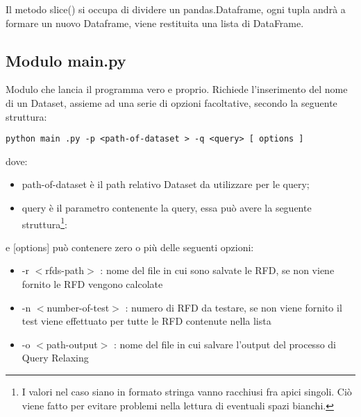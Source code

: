 Il metodo slice() si occupa di dividere un pandas.Dataframe, ogni tupla andrà a formare un nuovo Dataframe, viene restituita una lista di DataFrame.

\subsection{Modulo main.py}
Modulo che lancia il programma vero e proprio. Richiede
l'inserimento del nome di un Dataset, assieme ad una serie di opzioni
facoltative, secondo la seguente struttura:
\begin{listing}[H]
\begin{verbatim}
python main .py -p <path-of-dataset > -q <query> [ options ]
\end{verbatim}
\end{listing}

dove:
\begin{itemize}
\item path-of-dataset è il path relativo Dataset da utilizzare per le query;
\item query è il parametro contenente la query, essa può avere la seguente struttura\footnote{I valori nel caso siano in formato stringa vanno racchiusi fra apici singoli. Ciò viene fatto per evitare problemi nella lettura di eventuali spazi bianchi.}:
\end{itemize}
e [options] può contenere zero o più delle seguenti opzioni:

\begin{itemize}
\item -r $<$rfds-path$>$ : nome del file in cui sono salvate le RFD, se non viene fornito le RFD vengono calcolate
\item -n $<$number-of-test$>$ : numero di RFD da testare, se non viene fornito il test viene effettuato per tutte le RFD contenute nella lista
\item -o $<$path-output$>$ : nome del file in cui salvare l'output del processo di Query Relaxing
\end{itemize}


